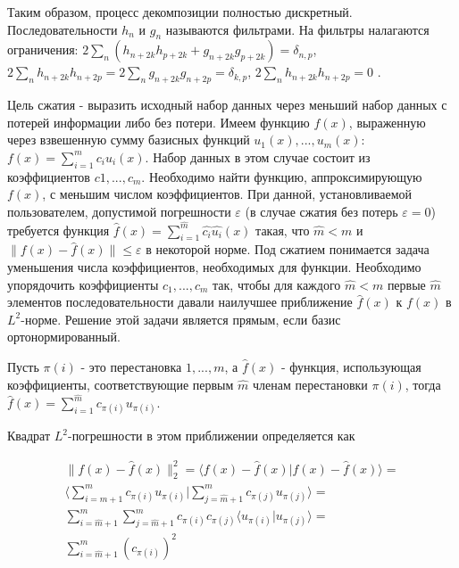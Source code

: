 Таким образом, процесс декомпозиции полностью дискретный. Последовательности $h_{n}$ и $g_{n}$ называются фильтрами. На фильтры налагаются ограничения:
$2\sum_{n}(h_{n+2k}h_{p+2k}+g_{n+2k}g_{p+2k})=\delta_{n,p}$, $2\sum_{n}h_{n+2k}h_{n+2p} = 2\sum_{n}g_{n+2k}g_{n+2p}=\delta_{k,p}$, $2\sum_{n}h_{n+2k}h_{n+2p} = 0$ \cite{Pup04}.

Цель сжатия - выразить исходный набор данных через меньший набор данных с потерей информации либо без потери.
Имеем функцию $f(x)$, выраженную через взвешенную сумму базисных функций $u_{1}(x),...,u_{m}(x)$: $f(x)=\sum_{i=1}^{m}c_{i}u_{i}(x)$.
Набор данных в этом случае состоит из коэффициентов $c{1},...,c_{m}$. Необходимо найти функцию, аппроксимирующую $f(x)$, с меньшим 
числом коэффициентов. При данной, установливаемой пользователем, допустимой погрешности $\varepsilon$ (в случае сжатия без потерь $\varepsilon = 0$) 
требуется функция $\hat{f}(x)= \sum_{i=1}^{\hat{m}}\hat{c_{i}}\hat{u_{i}}(x)$ такая, что $\hat{m}<m$ и $\|f(x)-\hat{f}(x)\|\le\varepsilon$ в некоторой норме.
Под сжатием понимается задача уменьшения числа коэффициентов, необходимых для функции. 
Необходимо упорядочить коэффициенты $c_{1},...,c_{m}$ так, чтобы для каждого $\hat{m}<m$ первые $\hat{m}$ элементов последовательности давали
наилучшее приближение $\hat{f}(x)$ к $f(x)$ в $L^{2}$-норме. Решение этой задачи является прямым, если базис ортонормированный. 

Пусть $\pi(i)$ - это перестановка $1,...,m$, а $\hat{f}(x)$ - функция, использующая коэффициенты, соответствующие первым $\hat{m}$ членам перестановки $\pi(i)$, 
тогда $\hat{f}(x) = \sum_{i=1}^{\hat{m}}c_{\pi(i)}u_{\pi(i)}$. 

Квадрат $L^{2}$-погрешности в этом приближении определяется как 

\begin{equation}
\begin{split}
 \|f(x)-\hat{f}(x)\|_{2}^{2}=\langle f(x)-\hat{f}(x)|f(x)-\hat{f}(x)\rangle= \\
 \langle \sum_{i=\hat{m}+1}^{m}c_{\pi(i)}u_{\pi(i)} | \sum_{j=\hat{m}+1}^{m}c_{\pi(j)}u_{\pi(j)} \rangle= \\
 \sum_{i=\hat{m}+1}^{m} \sum_{j=\hat{m}+1}^{m} c_{\pi(i)} c_{\pi(j)} \langle u_{\pi(i)} | u_{\pi(j)} \rangle= \\
 \sum_{i=\hat{m}+1}^{m}(c_{\pi(i)})^{2} 
\end{split}
\end{equation}

